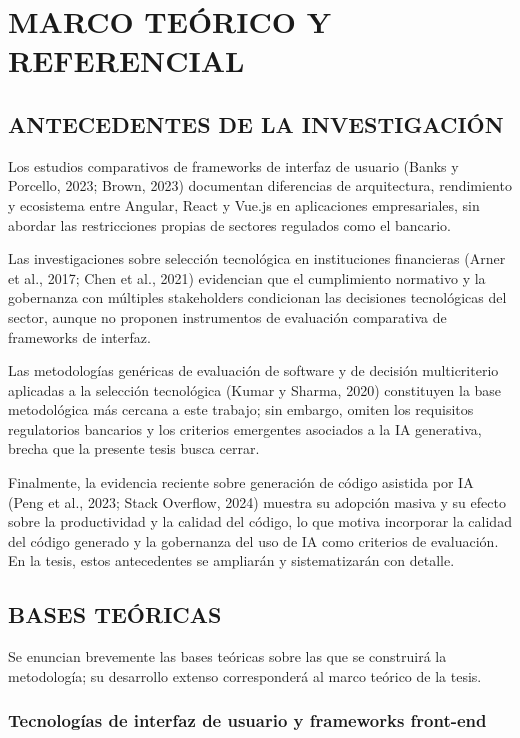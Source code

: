 \chapter{MARCO TEÓRICO Y REFERENCIAL}

\section{ANTECEDENTES DE LA INVESTIGACIÓN}

Los estudios comparativos de frameworks de interfaz de usuario (Banks y
Porcello, 2023; Brown, 2023) documentan diferencias de arquitectura,
rendimiento y ecosistema entre Angular, React y Vue.js en aplicaciones
empresariales, sin abordar las restricciones propias de sectores regulados
como el bancario.

Las investigaciones sobre selección tecnológica en instituciones financieras
(Arner et al., 2017; Chen et al., 2021) evidencian que el cumplimiento
normativo y la gobernanza con múltiples stakeholders condicionan las
decisiones tecnológicas del sector, aunque no proponen instrumentos de
evaluación comparativa de frameworks de interfaz.

Las metodologías genéricas de evaluación de software y de decisión
multicriterio aplicadas a la selección tecnológica (Kumar y Sharma, 2020)
constituyen la base metodológica más cercana a este trabajo; sin embargo,
omiten los requisitos regulatorios bancarios y los criterios emergentes
asociados a la IA generativa, brecha que la presente tesis busca cerrar.

Finalmente, la evidencia reciente sobre generación de código asistida por IA
(Peng et al., 2023; Stack Overflow, 2024) muestra su adopción masiva y su
efecto sobre la productividad y la calidad del código, lo que motiva
incorporar la calidad del código generado y la gobernanza del uso de IA como
criterios de evaluación. En la tesis, estos antecedentes se ampliarán y
sistematizarán con detalle.

\section{BASES TEÓRICAS}

Se enuncian brevemente las bases teóricas sobre las que se construirá la
metodología; su desarrollo extenso corresponderá al marco teórico de la tesis.

\subsection{Tecnologías de interfaz de usuario y frameworks front-end}

